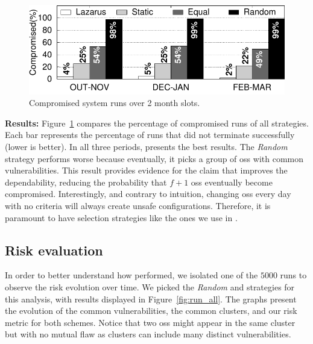 \begin{figure}[h]
\begin{center}
\includegraphics[width=\columnwidth]{images/gnuplot/executions_new/execution.pdf}
\caption{Compromised system runs over 2 month slots.}
\label{fig:all_vulns}
\end{center}
\end{figure}

\textbf{Results:} Figure~\ref{fig:all_vulns} compares the percentage of compromised runs of all strategies. 
Each bar represents the percentage of runs that did not terminate successfully (lower is better). 
In all three periods, \system presents the best results. 
The \emph{Random} strategy performs worse because eventually, it picks a group of \glspl{os} with common vulnerabilities. 
This result provides evidence for the claim that \system improves the dependability, reducing the probability that $f+1$ \glspl{os} eventually become compromised. 
Interestingly, and contrary to intuition, changing \glspl{os} every day with no criteria will always create unsafe configurations.
Therefore, it is paramount to have selection strategies like the ones we use in \system.

\subsection{Risk evaluation}


In order to better understand how \system performed, we isolated one of the $5000$ runs to observe the risk evolution over time. 
We picked the \emph{Random} and \system strategies for this analysis, with results displayed in Figure~\ref{fig:run_all}. 
The graphs present the evolution of the common vulnerabilities, the common clusters, and our risk metric for both schemes. 
Notice that two \glspl{os} might appear in the same cluster but with no mutual flaw as clusters can include many distinct vulnerabilities.

